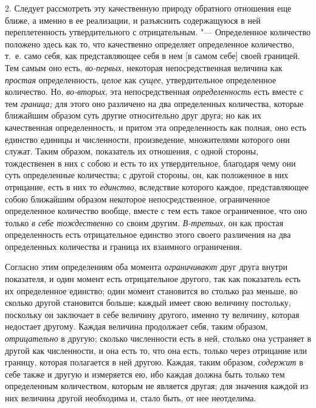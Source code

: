 2. Следует рассмотреть эту качественную природу обратного отношения еще
ближе, а именно в ее реализации, и разъяснить содержащуюся в ней
переплетенность утвердительного с отрицательным. "--- Определенное количество
положено здесь как то, что качественно определяет определенное
количество, т.~е. само себя, как представляющее себя в нем [в самом себе]
своей границей. Тем самым оно есть, {\em во-первых},
некоторая непосредственная величина как {\em простая}
определенность, {\em целое} как
{\em сущее}, утвердительное определенное количество.
Но, {\em во-вторых}, эта непосредственная
{\em определенность} есть вместе с тем
{\em граница;} для этого оно различено на два
определенных количества, которые ближайшим образом суть другие относительно
друг друга; но как их качественная определенность, и притом эта
определенность как полная, оно есть единство единицы и численности,
произведение, множителями которого они служат. Таким образом, показатель их
отношения, с одной стороны, тождественен в них с собою и есть то их
утвердительное, благодаря чему они суть определенные количества; с другой
стороны, он, как положенное в них отрицание, есть в них то
{\em единство}, вследствие которого каждое,
представляющее собою ближайшим образом некоторое непосредственное,
ограниченное определенное количество вообще, вместе с тем есть такое
ограниченное, что оно только {\em в себе тождественно}
со своим другим. {\em В-третьих}, он как простая
определенность есть отрицательное единство этого своего различения на два
определенных количества и граница их взаимного ограничения.

Согласно этим определениям оба момента
{\em ограничивают} друг друга внутри показателя, и один
момент есть отрицательное другого, так как показатель есть их определенное
единство; один момент становится во столько раз меньше, во сколько другой
становится больше; каждый имеет свою величину постольку, поскольку он
заключает в себе величину другого, именно ту величину, которая недостает
другому. Каждая величина продолжает себя, таким образом,
{\em отрицательно} в другую; сколько численности есть в
ней, столько она устраняет в другой как численности, и она есть то, что она
есть, только через отрицание или границу, которая полагается в ней другою.
Каждая, таким образом, {\em содержит} в себе также и
другую и измеряется ею, ибо каждая должна быть только тем определенным
количеством, которым не является другая; для значения каждой из них
величина другой необходима и, стало быть, от нее неотделима.

